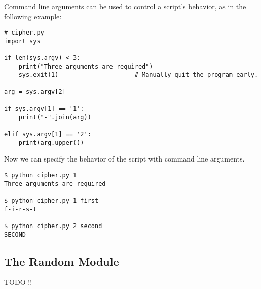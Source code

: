 Command line arguments can be used to control a script's behavior, as in the following example:

\begin{lstlisting}
# cipher.py
import sys

if len(sys.argv) < 3:
    print("Three arguments are required")
    sys.exit(1)                     # Manually quit the program early.

arg = sys.argv[2]

if sys.argv[1] == '1':
    print("-".join(arg))

elif sys.argv[1] == '2':
    print(arg.upper())
\end{lstlisting}

Now we can specify the behavior of the script with command line arguments.

\begin{lstlisting}
$ python cipher.py 1
Three arguments are required

$ python cipher.py 1 first
f-i-r-s-t

$ python cipher.py 2 second
SECOND
\end{lstlisting}


\subsection*{The Random Module} %

TODO !!


